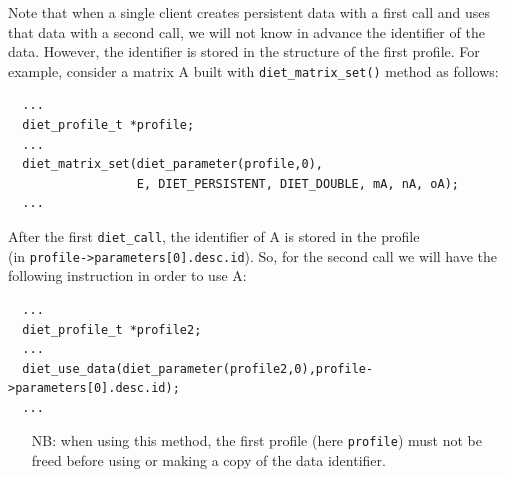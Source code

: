 Note that when a single client creates persistent data with a first
\diet call and uses that data with a second \diet call, we will not
know in advance the identifier of the data.  However, the identifier 
is stored in the structure of the first profile. For example,
consider a matrix A built with
\texttt{diet\_matrix\_set()} method as follows: {\footnotesize
\begin{verbatim}
  ...
  diet_profile_t *profile;
  ...
  diet_matrix_set(diet_parameter(profile,0),
                  E, DIET_PERSISTENT, DIET_DOUBLE, mA, nA, oA);
  ...
\end{verbatim}
} After the first \texttt{diet\_call}, the identifier of A is stored in
the profile \\ (in \texttt{profile->parameters[0].desc.id}). So, for the
second call we will have the following instruction in order to use A:
{\footnotesize
\begin{verbatim}
  ...
  diet_profile_t *profile2;
  ...
  diet_use_data(diet_parameter(profile2,0),profile->parameters[0].desc.id);
  ...
\end{verbatim}
}

\begin{itemize}
\item[NB:] when using this method, the first profile (here
\texttt{profile}) must not be freed before using or making a copy of
the data identifier.
\end{itemize}

